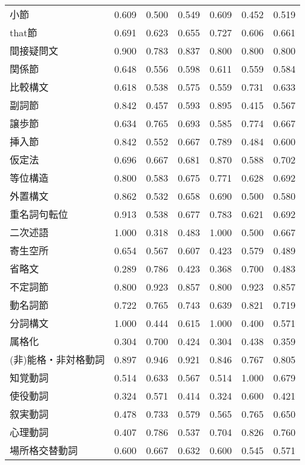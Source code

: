 \begin{table}[H]
\begin{tabular}{lcccccc}
    小節 & 0.609 & 0.500 & 0.549 & 0.609 & 0.452 & 0.519 \\
    that節 & 0.691 & 0.623 & 0.655 & 0.727 & 0.606 & 0.661 \\
    間接疑問文 & 0.900 & 0.783 & 0.837 & 0.800 & 0.800 & 0.800 \\
    関係節 & 0.648 & 0.556 & 0.598 & 0.611 & 0.559 & 0.584 \\
    比較構文 & 0.618 & 0.538 & 0.575 & 0.559 & 0.731 & 0.633 \\
    副詞節 & 0.842 & 0.457 & 0.593 & 0.895 & 0.415 & 0.567 \\
    譲歩節 & 0.634 & 0.765 & 0.693 & 0.585 & 0.774 & 0.667 \\
    挿入節 & 0.842 & 0.552 & 0.667 & 0.789 & 0.484 & 0.600 \\
    仮定法 & 0.696 & 0.667 & 0.681 & 0.870 & 0.588 & 0.702 \\
    等位構造 & 0.800 & 0.583 & 0.675 & 0.771 & 0.628 & 0.692 \\
    外置構文 & 0.862 & 0.532 & 0.658 & 0.690 & 0.500 & 0.580 \\
    重名詞句転位 & 0.913 & 0.538 & 0.677 & 0.783 & 0.621 & 0.692 \\
    二次述語 & 1.000 & 0.318 & 0.483 & 1.000 & 0.500 & 0.667 \\
    寄生空所 & 0.654 & 0.567 & 0.607 & 0.423 & 0.579 & 0.489 \\
    省略文 & 0.289 & 0.786 & 0.423 & 0.368 & 0.700 & 0.483 \\
    不定詞節 & 0.800 & 0.923 & 0.857 & 0.800 & 0.923 & 0.857 \\
    動名詞節 & 0.722 & 0.765 & 0.743 & 0.639 & 0.821 & 0.719 \\
    分詞構文 & 1.000 & 0.444 & 0.615 & 1.000 & 0.400 & 0.571 \\
    属格化 & 0.304 & 0.700 & 0.424 & 0.304 & 0.438 & 0.359 \\
    (非)能格・非対格動詞 & 0.897 & 0.946 & 0.921 & 0.846 & 0.767 & 0.805 \\
    知覚動詞 & 0.514 & 0.633 & 0.567 & 0.514 & 1.000 & 0.679 \\
    使役動詞 & 0.324 & 0.571 & 0.414 & 0.324 & 0.600 & 0.421 \\
    叙実動詞 & 0.478 & 0.733 & 0.579 & 0.565 & 0.765 & 0.650 \\
    心理動詞 & 0.407 & 0.786 & 0.537 & 0.704 & 0.826 & 0.760 \\
    場所格交替動詞 & 0.600 & 0.667 & 0.632 & 0.600 & 0.545 & 0.571 \\

\end{tabular}
\end{table}
